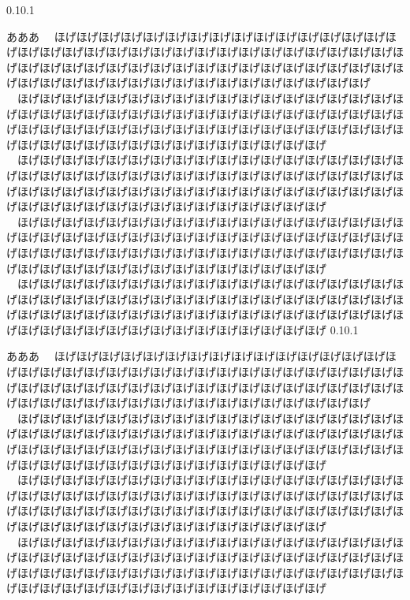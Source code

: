 \documentclass[autodetect-engine, dvipdfmx-if-dvi, ja=standard]{bxjsarticle}
\makeatletter
\renewcommand{\section}{%
    \@startsection{section}{1}{\z@}%
    {0.1\Cvs}{0.1\Cvs}%
    {\normalfont\large\headfont\raggedright}}
\makeatother
\begin{document}
\begin{multicols}{2}
\section{あああ}
　ほげほげほげほげほげほげほげほげほげほげほげほげほげほげほげほげほげほげほげほげほげほげほげほげほげほげほげほげほげほげほげほげほげほげほげほげほげほげほげほげほげほげほげほげほげほげほげほげほげほげほげほげほげほげほげほげほげほげほげほげほげほげほげほげほげほげほげほげ\\
　ほげほげほげほげほげほげほげほげほげほげほげほげほげほげほげほげほげほげほげほげほげほげほげほげほげほげほげほげほげほげほげほげほげほげほげほげほげほげほげほげほげほげほげほげほげほげほげほげほげほげほげほげほげほげほげほげほげほげほげほげほげほげほげほげほげほげほげほげ\\
　ほげほげほげほげほげほげほげほげほげほげほげほげほげほげほげほげほげほげほげほげほげほげほげほげほげほげほげほげほげほげほげほげほげほげほげほげほげほげほげほげほげほげほげほげほげほげほげほげほげほげほげほげほげほげほげほげほげほげほげほげほげほげほげほげほげほげほげほげ\\
　ほげほげほげほげほげほげほげほげほげほげほげほげほげほげほげほげほげほげほげほげほげほげほげほげほげほげほげほげほげほげほげほげほげほげほげほげほげほげほげほげほげほげほげほげほげほげほげほげほげほげほげほげほげほげほげほげほげほげほげほげほげほげほげほげほげほげほげほげ\\
　ほげほげほげほげほげほげほげほげほげほげほげほげほげほげほげほげほげほげほげほげほげほげほげほげほげほげほげほげほげほげほげほげほげほげほげほげほげほげほげほげほげほげほげほげほげほげほげほげほげほげほげほげほげほげほげほげほげほげほげほげほげほげほげほげほげほげほげほげ
\section{あああ}
　ほげほげほげほげほげほげほげほげほげほげほげほげほげほげほげほげほげほげほげほげほげほげほげほげほげほげほげほげほげほげほげほげほげほげほげほげほげほげほげほげほげほげほげほげほげほげほげほげほげほげほげほげほげほげほげほげほげほげほげほげほげほげほげほげほげほげほげほげ\\
　ほげほげほげほげほげほげほげほげほげほげほげほげほげほげほげほげほげほげほげほげほげほげほげほげほげほげほげほげほげほげほげほげほげほげほげほげほげほげほげほげほげほげほげほげほげほげほげほげほげほげほげほげほげほげほげほげほげほげほげほげほげほげほげほげほげほげほげほげ\\
　ほげほげほげほげほげほげほげほげほげほげほげほげほげほげほげほげほげほげほげほげほげほげほげほげほげほげほげほげほげほげほげほげほげほげほげほげほげほげほげほげほげほげほげほげほげほげほげほげほげほげほげほげほげほげほげほげほげほげほげほげほげほげほげほげほげほげほげほげ\\
　ほげほげほげほげほげほげほげほげほげほげほげほげほげほげほげほげほげほげほげほげほげほげほげほげほげほげほげほげほげほげほげほげほげほげほげほげほげほげほげほげほげほげほげほげほげほげほげほげほげほげほげほげほげほげほげほげほげほげほげほげほげほげほげほげほげほげほげほげ
\end{multicols}
\end{document}

